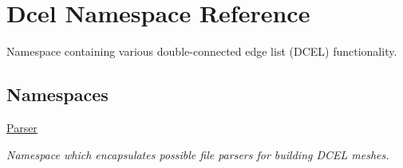 \hypertarget{namespaceDcel}{}\section{Dcel Namespace Reference}
\label{namespaceDcel}


Namespace containing various double-\/connected edge list (D\+C\+EL) functionality.  


\subsection*{Namespaces}
\begin{DoxyCompactItemize}
\item 
 \hyperlink{namespaceDcel_1_1Parser}{Parser}
\begin{DoxyCompactList}\small\item\em Namespace which encapsulates possible file parsers for building D\+C\+EL meshes. \end{DoxyCompactList}\end{DoxyCompactItemize}
